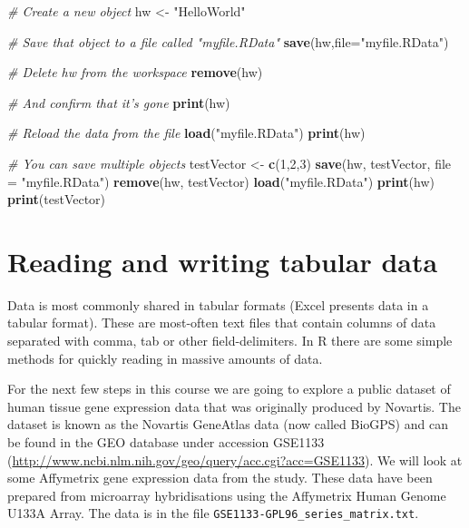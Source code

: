 \documentclass[a4paper]{book}
\newenvironment{Shaded}{\begin{snugshade}}{\end{snugshade}}
\newcommand{\KeywordTok}[1]{\textcolor[rgb]{0.13,0.29,0.53}{\textbf{{#1}}}}
\newcommand{\DataTypeTok}[1]{\textcolor[rgb]{0.13,0.29,0.53}{{#1}}}
\newcommand{\DecValTok}[1]{\textcolor[rgb]{0.00,0.00,0.81}{{#1}}}
\newcommand{\StringTok}[1]{\textcolor[rgb]{0.31,0.60,0.02}{{#1}}}
\newcommand{\CommentTok}[1]{\textcolor[rgb]{0.56,0.35,0.01}{\textit{{#1}}}}
\newcommand{\NormalTok}[1]{{#1}}
\renewenvironment{Shaded}
{\vspace{1.5em}\begin{leftbar}\begin{snugshade}}
{\end{snugshade}\end{leftbar}\vspace{3pt}}
\begin{document}
\begin{Shaded}
\begin{Highlighting}[]
\CommentTok{# Create a new object}
\NormalTok{hw <-}\StringTok{ "HelloWorld"}

\CommentTok{# Save that object to a file called "myfile.RData"}
\KeywordTok{save}\NormalTok{(hw,}\DataTypeTok{file=}\StringTok{"myfile.RData"}\NormalTok{)}

\CommentTok{# Delete hw from the workspace}
\KeywordTok{remove}\NormalTok{(hw)}

\CommentTok{# And confirm that it's gone}
\KeywordTok{print}\NormalTok{(hw)}

\CommentTok{# Reload the data from the file}
\KeywordTok{load}\NormalTok{(}\StringTok{"myfile.RData"}\NormalTok{)}
\KeywordTok{print}\NormalTok{(hw)}

\CommentTok{# You can save multiple objects}
\NormalTok{testVector <-}\StringTok{ }\KeywordTok{c}\NormalTok{(}\DecValTok{1}\NormalTok{,}\DecValTok{2}\NormalTok{,}\DecValTok{3}\NormalTok{)}
\KeywordTok{save}\NormalTok{(hw, testVector, }\DataTypeTok{file =} \StringTok{"myfile.RData"}\NormalTok{)}
\KeywordTok{remove}\NormalTok{(hw, testVector)}
\KeywordTok{load}\NormalTok{(}\StringTok{"myfile.RData"}\NormalTok{)}
\KeywordTok{print}\NormalTok{(hw)}
\KeywordTok{print}\NormalTok{(testVector)}
\end{Highlighting}
\end{Shaded}

\section{Reading and writing tabular
data}\label{reading-and-writing-tabular-data}

Data is most commonly shared in tabular formats (Excel presents data in
a tabular format). These are most-often text files that contain columns
of data separated with comma, tab or other field-delimiters. In R there
are some simple methods for quickly reading in massive amounts of data.

For the next few steps in this course we are going to explore a public
dataset of human tissue gene expression data that was originally
produced by Novartis. The dataset is known as the Novartis GeneAtlas
data (now called BioGPS) and can be found in the GEO database under
accession GSE1133
(\url{http://www.ncbi.nlm.nih.gov/geo/query/acc.cgi?acc=GSE1133}). We
will look at some Affymetrix gene expression data from the study. These
data have been prepared from microarray hybridisations using the
Affymetrix Human Genome U133A Array. The data is in the file
\texttt{GSE1133-GPL96\_series\_matrix.txt}.
\end{document}
